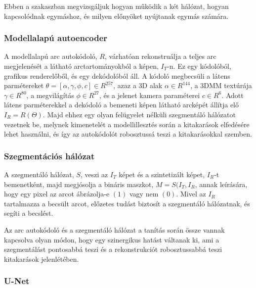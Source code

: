 \documentclass[12pt,a4]{article}
\begin{document}
            Ebben a szakaszban megvizsgáljuk hogyan működik a két hálózat,
     	      hogyan kapcsolódnak egymáshoz, és milyen előnyöket nyújtanak
     	      egymás számára.

            \subsubsection{Modellalapú autoencoder}
        
                \cite{focus}A modellalapú arc autokódoló, $R$, várhatóan rekonstruálja a teljes arc
     	          megjelenését a látható arctartományokból a képen, $I_{T}$-n. 
                Ez egy kódolóból, grafikus renderelőből, és egy dekódolóból áll. A kódoló megbecsüli a látens parmétereket $\theta = [\alpha, \gamma, \phi, c] \in R^{257}$, azaz a 3D alak $\alpha \in R^{144}$, a 3DMM textúrája 
                $\gamma ∈ R^{80}$, a megvilágítás $\phi ∈ R^{27}$, és a jelenet kamera paraméterei $c ∈ R^{6}$. Adott látens parméterekkel a dekódoló a bemeneti képen látható arcképét állítja elő $I_{R} = R(\Theta)$. Majd ehhez egy olyan felügyelet nélküli szegmentáló hálózatot vezetnek be, melynek kimenetelét a modellillesztés során a kitakarások elfedésére lehet használni, és így az autokódolót robosztussá teszi a kitakarásokkal szemben.

            \subsubsection{Szegmentációs hálózat}
    
                \cite{focus}A szegmentáló hálózat, $S$, veszi az $I_{T}$ képet és a szintetizált képet, $I_{R}$-t bemenetként, majd megjósolja a bináris maszkot, $M = S(I_{T} , I_{R}$, annak leírására, hogy egy pixel az arcot ábrázolja-e $(1)$ vagy nem $(0)$. Mivel az $I_R$ tartalmazza a becsült arcot, előzetes tudást biztosít a szegmentáló hálózatnak, és segíti a becslést.
     	
     	          Az arc autokódoló és a szegmentáló hálózat a tanítás során össze 
                vannak kapcsolva olyan módon, hogy egy szinergikus hatást váltanak ki, ami a szegmentálást pontosabbá teszi és a rekonstrukciót robosztussabbá teszi kitakarások jelenlétében.

            \subsubsection{U-Net}
    
\end{document}
